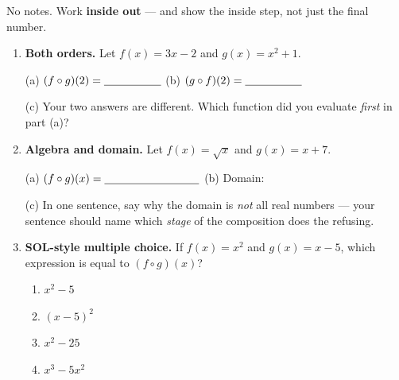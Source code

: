\documentclass[10pt]{article}
\begin{document}
\namedateperiod

\vspace{0.08in}

No notes. Work \textbf{inside out} --- and show the inside step, not just the final number.

\begin{enumerate}[leftmargin=1.8em, itemsep=10pt]
  \item \textbf{Both orders.} Let $f(x)=3x-2$ and $g(x)=x^{2}+1$.
        \vspace{0.62in}

        (a) $(f\circ g)(2)=\blank{1.8cm}$ \hspace{0.35in}
        (b) $(g\circ f)(2)=\blank{1.8cm}$

        \vspace{4pt}
        (c) Your two answers are different. Which function did you evaluate \emph{first} in part (a)?
        \blank{4.2cm}

  \item \textbf{Algebra and domain.} Let $f(x)=\sqrt{x}$ and $g(x)=x+7$.
        \vspace{0.55in}

        (a) $(f\circ g)(x)=\blank{3.0cm}$ \hspace{0.3in}
        (b) Domain: \blank{3.4cm}

        \vspace{5pt}
        (c) In one sentence, say why the domain is \emph{not} all real numbers --- your sentence
        should name which \emph{stage} of the composition does the refusing. \writeline

  \item \textbf{SOL-style multiple choice.} If $f(x)=x^{2}$ and $g(x)=x-5$, which expression is
        equal to $(f\circ g)(x)$?
        \begin{enumerate}[label=\Alph*., leftmargin=1.9em, itemsep=1pt]
          \item $x^{2}-5$
          \item $(x-5)^{2}$
          \item $x^{2}-25$
          \item $x^{3}-5x^{2}$
        \end{enumerate}
\end{enumerate}
\end{document}
